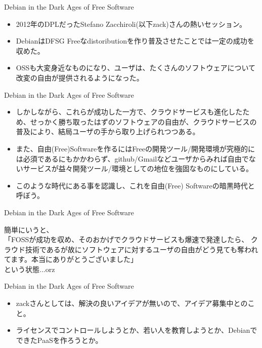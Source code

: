 \begin{frame}{Debian in the Dark Ages of Free Software}

 \begin{itemize}
 \item  2012年のDPLだったStefano Zacchiroli(以下zack)さんの熱いセッション。
 \item DebianはDFSG Freeなdistoributionを作り普及させたことでは一定の成功を収めた。
 \item OSSも大変身近なものになり、ユーザは、たくさんのソフトウェアについて改変の自由が提供されるようになった。
 \end{itemize}
\end{frame}

\begin{frame}{Debian in the Dark Ages of Free Software}
 \begin{itemize}
  \item しかしながら、これらが成功した一方で、クラウドサービスも進化したため、せっかく勝ち取ったはずのソフトウェアの自由が、クラウドサービスの普及により、結局ユーザの手から取り上げられつつある。
 \item また、自由(Free)Softwareを作るにはFreeの開発ツール/開発環境が究極的には必須であるにもかかわらず、github/Gmailなどユーザからみれば自由でないサービスが益々開発ツール/環境としての地位を強固なものにしている。
 \item このような時代にある事を認識し、これを自由(Free) Softwareの暗黒時代と呼ぼう。
\end{itemize}
\end{frame}

\begin{frame}{Debian in the Dark Ages of Free Software}

{\Large 簡単にいうと、\\
「FOSSが成功を収め、そのおかげでクラウドサービスも爆速で発達したら、
 クラウド技術であるが故にソフトウェアに対するユーザの自由がどう見ても奪われてます。本当にありがとうございました」\\
という状態...orz }
\end{frame}


\begin{frame}{Debian in the Dark Ages of Free Software}

 \begin{itemize}
\item zackさんとしては、解決の良いアイデアが無いので、アイデア募集中とのこと。
\item ライセンスでコントロールしようとか、若い人を教育しようとか、DebianでできたPaaSを作ろうとか。
 \end{itemize}

\end{frame}

